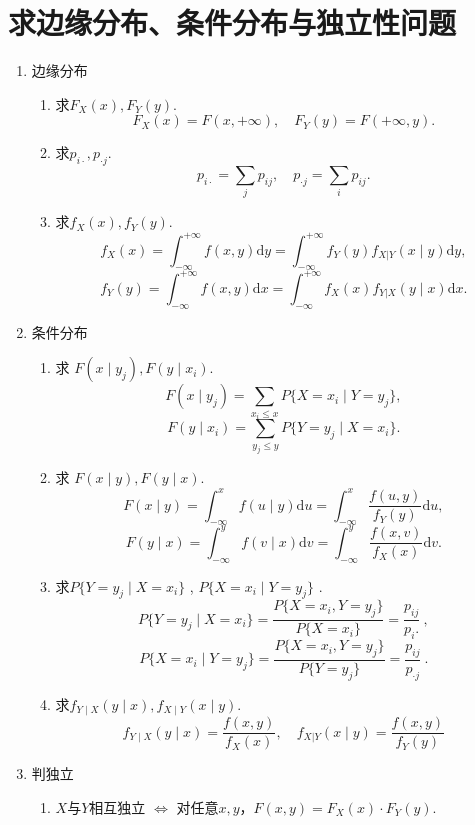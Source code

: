 \section{求边缘分布、条件分布与独立性问题}
\begin{enumerate}
    \item 边缘分布
          \begin{enumerate}
              \item 求$F_X(x),F_Y(y)$.
                    $$F_{X}(x)=F(x,+\infty) ,\quad F_{Y}(y)=F(+\infty,y).$$
              \item 求$p_{i\cdot},p_{\cdot j}$.
                    $$p_{i\cdot}=\sum_{j}p_{ij},\quad p_{\cdot j}=\sum_{i}p_{ij}.$$
              \item 求$f_X(x),f_Y(y)$.
                    $$f_{X}(x)=\int_{-\infty}^{+\infty}f(x,y)\mathrm{d}y=\int_{-\infty}^{+\infty}f_{Y}(y)f_{X|Y}(x\mid y)\mathrm{d}y,$$
                    $$f_{Y}(y)=\int_{-\infty}^{+\infty}f(x,y)\mathrm{d}x=\int_{-\infty}^{+\infty}f_{X}(x)f_{Y|X}(y\mid x)\mathrm{d}x.$$
          \end{enumerate}
    \item 条件分布
          \begin{enumerate}
              \item 求 $F(x\mid y_j),F(y\mid x_i).$
                    $$F(x\mid y_{j})=\sum_{x_{i}\leq x}P\{X=x_{i}\mid Y=y_{j}\},$$
                    $$F(y\mid x_{i})=\sum_{y_{j}\leq y}P\{Y=y_{j}\mid X=x_{i}\}.$$
              \item 求 $F(x\mid y),F(y\mid x).$
                    $$F(x\mid y)=\int_{-\infty}^{x}f(u\mid y)\mathrm{d}u=\int_{-\infty}^{x}\frac{f(u,y)}{f_{Y}(y)}\mathrm{d}u,$$
                    $$F(y\mid x)=\int_{-\infty}^{y}f(v\mid x)\mathrm{d}v=\int_{-\infty}^{y}\frac{f(x,v)}{f_{X}(x)}\mathrm{d}v.$$
              \item 求$P\{ Y= y_{j}\mid X= x_{i}\}$ , $P\{ X= x_{i}\mid Y= y_{j}\}$ .
                    $$P\{Y=y_{j}\mid X=x_{i}\}=\frac{P\{X=x_{i},Y=y_{j}\}}{P\{X=x_{i}\}}=\frac{p_{ij}}{p_{i}.}\:,$$
                    $$P\{X=x_{i}\mid Y=y_{j}\}=\frac{P\Big\{X=x_{i},Y=y_{j}\Big\}}{P\Big\{Y=y_{j}\Big\}}=\frac{p_{ij}}{p_{\cdot j}}\:.$$
              \item 求$f_{Y\mid X}(y\mid x),f_{X\mid Y}(x\mid y).$
                    $$f_{Y\mid X}(y\mid x)=\frac{f(x,y)}{f_{X}(x)},\quad f_{X|Y}(x\mid y)=\frac{f(x,y)}{f_{Y}(y)}$$
          \end{enumerate}
    \item 判独立
          \begin{enumerate}
              \item $X$与$Y$相互独立 $\Leftrightarrow$ 对任意$x,y$，$F(x,y)=F_X(x)\cdot F_Y(y)$.


\end{enumerate}
\end{enumerate}
